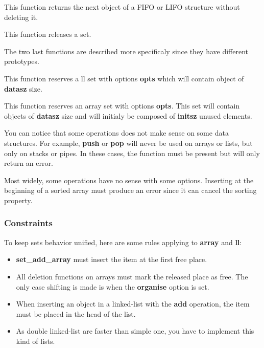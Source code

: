 This  function returns the  next object  of a  FIFO or  LIFO structure
without deleting it.


This function releases a set.

The two last functions are  described more specificaly since they have
different prototypes.


This function reserves a ll set with options \textbf{opts} which will contain
object of \textbf{datasz} size.


This function reserves an array set with options \textbf{opts}. This
set will contain objects of \textbf{datasz} size and will initialy
be composed of \textbf{initsz} unused elements.

You can notice  that some operations does not make  sense on some data
structures. For  example, \textbf{push} or \textbf{pop}  will never be
used on arrays or lists, but  only on stacks or pipes. In these cases,
the function must be present but will only return an error.

Most   widely,    some   operations   have   no    sense   with   some
options. Inserting at the beginning  of a sorted array must produce an
error since it can cancel the sorting property.

\subsubsection{Constraints}

To  keep  sets behavior  unified,  here  are  some rules  applying  to
\textbf{array} and \textbf{ll}:

\begin{itemize}

\item \textbf{set\_add\_array} must insert the item at the first free place.

\item All deletion functions on arrays must mark the released place as
free. The only case shifting is made is when the \textbf{organise} option
is set.

\item When inserting an object in a linked-list with the \textbf{add}
operation, the item must be placed in the head of the list.

\item As double linked-list are faster than simple one, you have to
implement this kind of lists.

\end{itemize}

